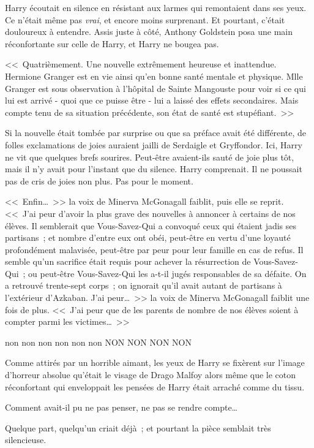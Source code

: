 Harry écoutait en silence en résistant aux larmes qui remontaient dans ses yeux. Ce n'était même pas \emph{vrai}, et encore moins surprenant. Et pourtant, c'était douloureux à entendre. Assis juste à côté, Anthony Goldstein posa une main réconfortante sur celle de Harry, et Harry ne bougea pas.

<<~Quatrièmement. Une nouvelle extrêmement heureuse et inattendue. Hermione Granger est en vie ainsi qu'en bonne santé mentale et physique. Mlle Granger est sous observation à l'hôpital de Sainte Mangouste pour voir si ce qui lui est arrivé - quoi que ce puisse être - lui a laissé des effets secondaires. Mais compte tenu de sa situation précédente, son état de santé est stupéfiant.~>>

Si la nouvelle était tombée par surprise ou que sa préface avait été différente, de folles exclamations de joies auraient jailli de Serdaigle et Gryffondor. Ici, Harry ne vit que quelques brefs sourires. Peut-être avaient-ils sauté de joie plus tôt, mais il n'y avait pour l'instant que du silence. Harry comprenait. Il ne poussait pas de cris de joies non plus. Pas pour le moment.

<<~Enfin…~>> la voix de Minerva McGonagall faiblit, puis elle se reprit. <<~J'ai peur d'avoir la plus grave des nouvelles à annoncer à certains de nos élèves. Il semblerait que Vous-Savez-Qui a convoqué ceux qui étaient jadis ses partisans~; et nombre d'entre eux ont obéi, peut-être en vertu d'une loyauté profondément malavisée, peut-être par peur pour leur famille en cas de refus. Il semble qu'un sacrifice était requis pour achever la résurrection de Vous-Savez-Qui~; ou peut-être Vous-Savez-Qui les a-t-il jugés responsables de sa défaite. On a retrouvé trente-sept corps~; on ignorait qu'il avait autant de partisans à l'extérieur d'Azkaban. J'ai peur…~>> la voix de Minerva McGonagall faiblit une fois de plus. <<~J'ai peur que de les parents de nombre de nos élèves soient à compter parmi les victimes…~>>

non non non non non non NON NON NON NON

Comme attirés par un horrible aimant, les yeux de Harry se fixèrent sur l'image d'horreur absolue qu'était le visage de Drago Malfoy alors même que le coton réconfortant qui enveloppait les pensées de Harry était arraché comme du tissu.

Comment avait-il pu ne pas penser, ne pas se rendre compte…

Quelque part, quelqu'un criait déjà~; et pourtant la pièce semblait très silencieuse.

